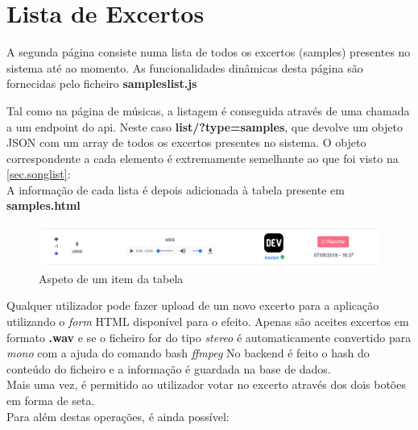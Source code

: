 \documentclass{report}
\begin{document}
\section{Lista de Excertos}
\label{sec.samplist}

A segunda página consiste numa lista de todos os excertos (samples) presentes no sistema até ao momento.
As funcionalidades dinâmicas desta página são fornecidas pelo ficheiro \textbf{sampleslist.js}

Tal como na página de músicas, a listagem é conseguida através de uma chamada a um endpoint do api. Neste caso \textbf{list/?type=samples},
que devolve um objeto JSON com um array de todos os excertos presentes no sistema. O objeto correspondente a cada elemento é extremamente semelhante ao que foi visto na \autoref{sec.songlist}:\\

A informação de cada lista é depois adicionada à tabela presente em \textbf{samples.html} \\

\begin{figure}[H]
	\includegraphics[scale=0.35]{sample_list_item.png}
	\caption{Aspeto de um item da tabela}
	\label{img.sample_list_item}
\end{figure}

Qualquer utilizador pode fazer upload de um novo excerto para a aplicação utilizando o \textit{form} HTML disponível para o efeito.
Apenas são aceites excertos em formato \textbf{.wav} e se o ficheiro for do tipo \textit{stereo} é automaticamente convertido para \textit{mono} com a ajuda do comando bash \textit{ffmpeg}
No backend é feito o hash do conteúdo do ficheiro e a informação é guardada na base de dados.\\

Mais uma vez, é permitido ao utilizador votar no excerto através dos dois botões em forma de seta. \\

Para além destas operações, é ainda possível:
\end{document}
